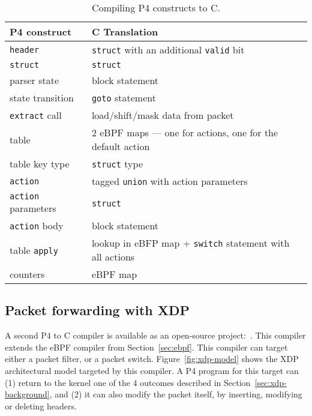\begin{table}[h]
  \footnotesize
  \begin{tabular}{|l|p{4.8cm}|} \hline
    \textbf{P4 construct} & \textbf{C Translation} \\ \hline \hline
    \texttt{header} & \texttt{struct} with an additional \texttt{valid} bit \\ \hline
    \texttt{struct} & \texttt{struct} \\ \hline
    parser state    & block statement \\ \hline
    state transition & \texttt{goto} statement \\ \hline
    \texttt{extract} call & load/shift/mask data from packet \\ \hline
    table & 2 eBPF maps --- one for actions, one for the default action \\ \hline
    table key type & \texttt{struct} type \\ \hline
    \texttt{action} & tagged \texttt{union} with action parameters \\ \hline
    \texttt{action} parameters & \texttt{struct} \\ \hline
    \texttt{action} body & block statement \\ \hline
    table \texttt{apply} & lookup in eBFP map + \texttt{switch} statement with all actions \\ \hline
    counters & eBPF map \\ \hline
  \end{tabular}
  \caption{Compiling P4 constructs to C.}\label{table:translation}
\end{table}

\subsection{Packet forwarding with XDP}\label{sec:xdp}

A second P4 to C compiler is available as an open-source
project:~\cite{p4-xdp-backend}.  This compiler extends the eBPF
compiler from Section~\ref{sec:ebpf}.  This compiler can target either
a packet filter, or a packet switch.  Figure~\ref{fig:xdp-model} shows
the XDP architectural model targeted by this compiler.  A P4 program
for this target can (1) return to the kernel one of the 4 outcomes
described in Section~\ref{sec:xdp-background}, and (2) it can also
modify the packet itself, by inserting, modifying or deleting headers.

